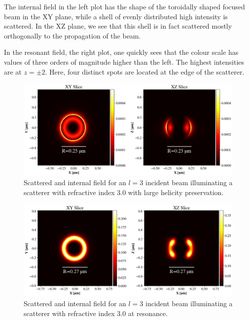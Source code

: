 The internal field in the left plot has the shape of the toroidally shaped focused beam in the XY plane, while a shell of evenly distributed high intensity is scattered. In the XZ plane, we see that this shell is in fact scattered mostly orthogonally to the propagation of the beam.

In the resonant field, the right plot, one quickly sees that the colour scale has values of three orders of magnitude higher than the left. The highest intensities are at \( z = \pm 2 \). Here, four distinct spots are located at the edge of the scatterer.

\begin{figure}
    \includegraphics[width=\textwidth]{Figures/scat_pres_l3.png}
    \caption{Scattered and internal field for an \( l = 3 \) incident beam illuminating a scatterer with refractive index \( 3.0 \) with large helicity preservation.}
    \label{fig:scatfig1}
\end{figure}

\begin{figure}
    \includegraphics[width=\textwidth]{Figures/scat_res_l3.png}
    \caption{Scattered and internal field for an \( l = 3 \) incident beam illuminating a scatterer with refractive index \( 3.0 \) at resonance.}
    \label{fig:scatfig2}
\end{figure}